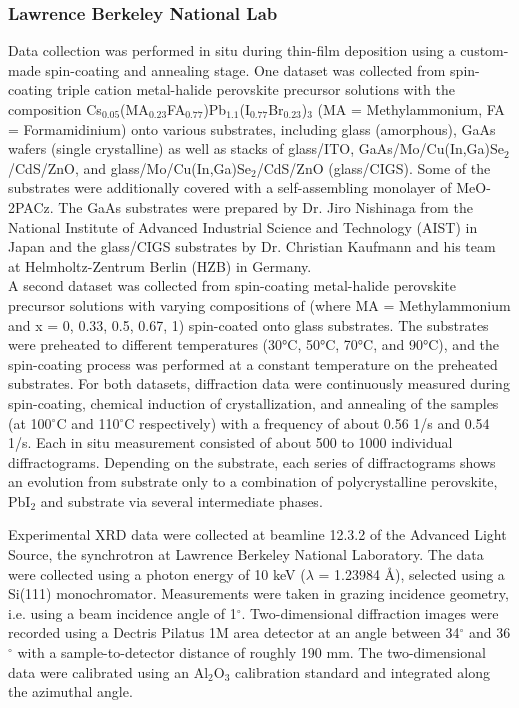 \subsubsection*{Lawrence Berkeley National Lab}

Data collection was performed in situ during thin-film deposition using a custom-made spin-coating and annealing stage. One dataset was collected from spin-coating triple cation metal-halide perovskite precursor solutions with the composition Cs$_{0.05}$(MA$_{0.23}$FA$_{0.77}$)Pb$_{1.1}$(I$_{0.77}$Br$_{0.23}$)$_{3}$ (MA = Methylammonium, FA = Formamidinium) onto various substrates, including glass (amorphous), GaAs wafers (single crystalline) as well as stacks of glass/ITO, GaAs/Mo/Cu(In,Ga)Se$_{2}$/CdS/ZnO, and glass/Mo/Cu(In,Ga)Se$_{2}$/CdS/ZnO (glass/CIGS). Some of the substrates were additionally covered with a self-assembling monolayer of MeO-2PACz. The GaAs substrates were prepared by Dr. Jiro Nishinaga from the National Institute of Advanced Industrial Science and Technology (AIST) in Japan and the glass/CIGS substrates by Dr. Christian Kaufmann and his team at Helmholtz-Zentrum Berlin (HZB) in Germany. \\

A second dataset was collected from spin-coating metal-halide perovskite precursor solutions with varying compositions of  (where MA = Methylammonium and x = 0, 0.33, 0.5, 0.67, 1) spin-coated onto glass substrates. The substrates were preheated to different temperatures (30°C, 50°C, 70°C, and 90°C), and the spin-coating process was performed at a constant temperature on the preheated substrates. For both datasets, diffraction data were continuously measured during spin-coating, chemical induction of crystallization, and annealing of the samples (at 100$^{\circ}$C and 110$^{\circ}$C respectively) with a frequency of about 0.56 1/s and 0.54 1/s. Each in situ measurement consisted of about 500 to 1000 individual diffractograms. Depending on the substrate, each series of diffractograms shows an evolution from substrate only to a combination of polycrystalline perovskite, PbI$_{2}$ and substrate via several intermediate phases.

Experimental XRD data were collected at beamline 12.3.2 of the Advanced Light Source, the synchrotron at Lawrence Berkeley National Laboratory. The data were collected using a photon energy of 10 keV ($\lambda$ = 1.23984 \AA), selected using a Si(111) monochromator. Measurements were taken in grazing incidence geometry, i.e. using a beam incidence angle of 1$^{\circ}$. Two-dimensional diffraction images were recorded using a Dectris Pilatus 1M area detector at an angle between 34$^{\circ}$ and 36$^{\circ}$ with a sample-to-detector distance of roughly 190 mm. The two-dimensional data were calibrated using an Al$_{2}$O$_{3}$ calibration standard and integrated along the azimuthal angle. \\


